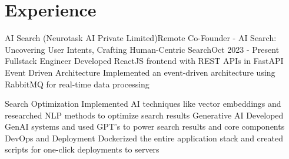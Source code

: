 \section{Experience}
\resumeSubHeadingListStart
\resumeSubheading
{AI Search (Neurotask AI Private Limited)}{Remote}
{Co-Founder - AI Search: Uncovering User Intents, Crafting Human-Centric Search}{Oct 2023 - Present}
\resumeItemListStart
\resumeItem
{Fullstack Engineer}
{Developed ReactJS frontend with REST APIs in FastAPI}
\resumeItem
{Event Driven Architecture}
{Implemented an event-driven architecture using RabbitMQ for real-time data processing}

\resumeItem
{Search Optimization}
{Implemented AI techniques like vector embeddings and researched NLP methods to optimize search results}
\resumeItem
{Generative AI}
{Developed GenAI systems and used GPT's to power search results and core components}
\resumeItem
{DevOps and Deployment}
{Dockerized the entire application stack and created scripts for one-click deployments to servers}
\resumeItemListEnd
\resumeSubHeadingListEnd

